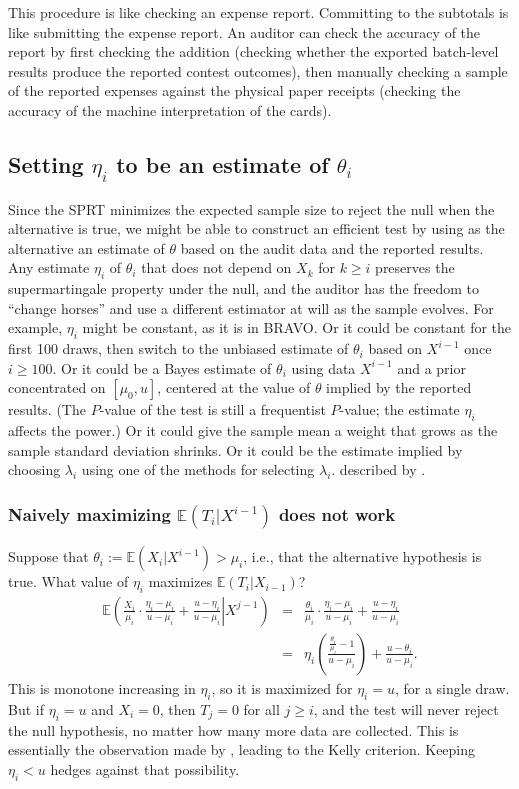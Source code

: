 \documentclass[aoas]{imsart}
\newcommand{\EE}{\mathbb{E}}
\begin{document}
This procedure is like checking an expense report. 
Committing to the subtotals is like submitting the expense report.
An auditor can check the accuracy of the report by first checking the addition 
(checking whether the exported batch-level results produce the reported contest outcomes), then manually checking a sample of 
the reported expenses against the physical paper receipts (checking the accuracy of the machine interpretation of the cards).


\subsection{Setting $\eta_i$ to be an estimate of $\theta_i$}
Since the SPRT minimizes the expected sample size to reject the null when the alternative is true,
we might be able to construct an efficient test by using as the alternative an estimate of $\theta$
based on the audit data and the reported results.
Any estimate $\eta_i$ of $\theta_i$ that does not depend on $X_k$ for $k \ge i$ preserves the supermartingale property
under the null, 
and the auditor has the freedom to ``change horses'' and use a different estimator
at will as the sample evolves. 
For example, $\eta_i$ might be constant, as it is in BRAVO.
Or it could be constant for the first 100 draws, then switch to the unbiased estimate of $\theta_i$ 
based on $X^{i-1}$ once $i \ge 100$.
Or it could be a Bayes estimate of $\theta_i$ using data $X^{i-1}$ and a prior concentrated on
$[\mu_0, u]$, centered at the value of $\theta$ implied by the reported results.
(The $P$-value of the test is still a frequentist $P$-value; the estimate $\eta_i$ affects the power.)
Or it could give the sample mean a weight that grows as the sample standard deviation shrinks.
Or it could be the estimate implied by choosing $\lambda_i$ using one of the methods for selecting $\lambda_i$.
described by \citet{waudby-smithRamdas21}.

\subsubsection{Naively maximizing $\EE (T_i| X^{i-1})$ does not work}
Suppose that $\theta_i := \EE (X_i | X^{i-1}) > \mu_i$, i.e., that the alternative hypothesis is true. 
What value of $\eta_i$ maximizes $\EE (T_i | X_{i-1})$?
\begin{eqnarray}
\EE \left ( \left . \frac{X_i}{\mu_i} \cdot \frac{\eta_i-\mu_i}{u-\mu_i} + \frac{u-\eta_i}{u-\mu_i} \right | X^{j-1} \right ) &=&
\frac{\theta_i}{\mu_i} \cdot \frac{\eta_i-\mu_i}{u-\mu_i} + \frac{u-\eta_i}{u-\mu_i} \nonumber \\
&=& \eta_i \left ( \frac{\frac{\theta_i}{\mu_i} - 1}{u-\mu_i} \right ) + \frac{u-\theta_i}{u-\mu_i}.
\end{eqnarray}
This is monotone increasing in $\eta_i$, so it is maximized for $\eta_i = u$, for a single draw.
But if $\eta_i=u$ and $X_i = 0$, then $T_j = 0$ for all $j \ge i$, and the test will never reject the null
hypothesis, no matter how many more data are collected.
This is essentially the observation made by \citet{kelly56}, leading to the
Kelly criterion.
Keeping $\eta_i < u$ hedges against that possibility.
\end{document}
